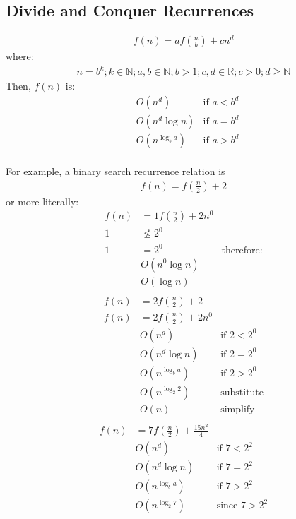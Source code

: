 \documentclass{article}
\begin{document}
\subsection{Divide and Conquer Recurrences}
\begin{align*}
f(n) = af(\frac{n}{b}) + cn^d
\end{align*}
where:
\begin{align*}
n = b^k; k \in \mathbb{N}; a,b \in \mathbb{N}; b > 1; c,d \in \mathbb{R}; c > 0; d \geq \mathbb{N}
\end{align*}
Then, $f(n)$ is:
\begin{align*}
& O(n^d) & \text{if $a < b^d$} \\
& O(n^d\log n) & \text{if $a = b^d$} \\
& O(n^{\log_b a}) & \text{if $a > b^d$} \\
\end{align*}

For example, a binary search recurrence relation is
\begin{align}
f(n) = f(\frac{n}{2}) + 2
\end{align}
or more literally:
\begin{align}
f(n) &= 1f(\frac{n}{2}) + 2n^0 &\\
1 &\nleq 2^0 &\\
1 &= 2^0 &\text{therefore:} \\
&O(n^0\log n)& \\
&O(\log n)& \\
\end{align}
\begin{align*}
f(n) &= 2f(\frac{n}{2}) + 2 \\
f(n) &= 2f(\frac{n}{2}) + 2n^0 \\
& O(n^d) & \text{if $2 < 2^0$} \\
& O(n^d\log n) & \text{if $2 = 2^0$} \\
& O(n^{\log_b a}) & \text{if $2 > 2^0$} \\
& O(n^{\log_2 2}) & \text{substitute}\\
& O(n) & \text{simplify}\\
\end{align*}
\begin{align*}
f(n) &= 7f(\frac{n}{2}) + \frac{15n^2}{4} \\
& O(n^d) & \text{if $7 < 2^2$} \\
& O(n^d\log n) & \text{if $7 = 2^2$} \\
& O(n^{\log_b a}) & \text{if $7 > 2^2$} \\
& O(n^{\log_2 7}) & \text{since $7 > 2^2$} \\
\end{align*}
\end{document}
